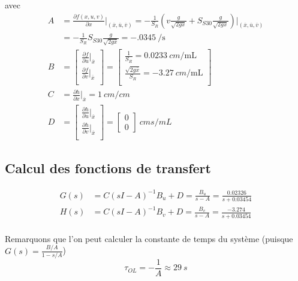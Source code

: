 \documentclass[frenchb, paper=a4, fontsize=11pt]{scrartcl}
\newcommand*\eq[1]{\overline{#1}} 				%
\numberwithin{equation}{section}					%
\numberwithin{figure}{section}					%
\numberwithin{table}{section}						%
\begin{document}
avec 
\begin{align}
A& = \frac{\partial f(x,u,v)}{\partial x}\rvert_{(\eq{x},\eq{u},\eq{v})} = -\frac{1}{S_R}(v\frac{g}{\sqrt{2gx}} + S_{S30}\frac{g}{\sqrt{2gx}})\rvert_{(\eq{x},\eq{u},\eq{v})} \\
&= -\frac{1}{S_R	} S_{S30} \frac{g}{\sqrt{2g\eq{x}}} = \SI{-.0345}{\per\second}\\
B &=\left[ \begin{array}{l}
 \frac{\partial f}{\partial u}\rvert_{\eq{x}} \\
  \frac{\partial f}{\partial v} \rvert_{\eq{x}}\\
\end{array} \right] 
= \left[ \begin{array}{l}
 \frac{1}{S_R} = \SI{0.0233}{cm\per \milli\liter}\\
  \frac{\sqrt{2g\eq{x}}}{S_R}= \SI{-3.27}{cm \per\milli\liter}\\
\end{array} \right] \\
C &= \frac{\partial h}{\partial x}\rvert_{\eq{x}} = \SI{1}{cm/cm}\\
D&=\left[ \begin{array}{l}
 \frac{\partial h}{\partial u}\rvert_{\eq{x}} \\
  \frac{\partial h}{\partial v} \rvert_{\eq{x}}\\
\end{array} \right]  = \left[ \begin{array}{l}
0\\
0
\end{array} \right] \SI{}{cm s \per mL}
\end{align}

\subsection{Calcul des fonctions de transfert}
\begin{align}
G(s) &= C(sI-A)^{-1}B_u + D = \frac{B_u}{s-A}= \frac{0.02326}{s+0.03454}\\
H(s) &= C(sI-A)^{-1}B_v + D = \frac{B_v}{s-A} = \frac{-3.274}{s+0.03454}\\
\end{align}

Remarquons que l'on peut calculer la constante de temps du système (puisque $G(s) = \frac{B/A}{1-s/A}$)
\begin{equation}
\tau_{OL} = -\frac{1}{A} \approx \SI{29}{s}
\end{equation}
\end{document}
